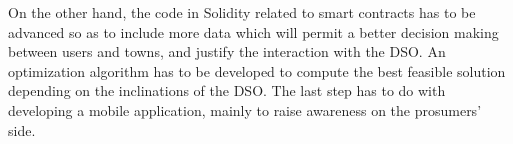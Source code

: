 On the other hand, the code in Solidity related to smart contracts has to be advanced so as to include more data which will permit a better decision making between users and towns, and justify the interaction with the DSO. An optimization algorithm has to be developed to compute the best feasible solution depending on the inclinations of the DSO. The last step has to do with developing a mobile application, mainly to raise awareness on the prosumers' side.

